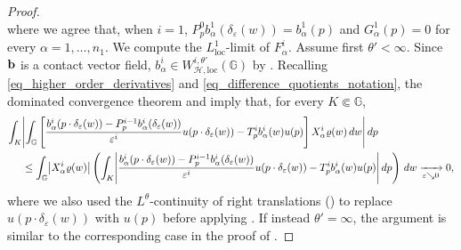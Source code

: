 \documentclass[11pt]{amsart}
\newcommand{\hhh}{{\mathcal{H}}}
\newcommand{\bb}{{\bf {b}}} %
\renewcommand{\rho}{\varrho} %
\newcommand{\Om}{\Omega}
\newcommand{\eps}{\varepsilon}
\DeclarePairedDelimiter{\abs}{\lvert}{\rvert}
\theoremstyle{plain}
\theoremstyle{definition}
\theoremstyle{remark}
\numberwithin{equation}{section}
\begin{document}
\begin{proof}
\begin{equation*}
\end{equation*}
where we agree that, when $i=1$, $P^0_p b^1_\alpha(\delta_\eps(w)) = b^1_\alpha(p)$ and $G^1_\alpha(p)=0$ for every $\alpha=1,\dots,n_1$. We compute the $L^1_{\mathrm {loc}}$-limit of $F^i_\alpha$. Assume first $\theta'<\infty$. Since $\bb$ is a contact vector field, $b^i_\alpha \in W^{i,\theta'}_{\hhh,\mathrm{loc}}(\mathbb{G})$ by . Recalling \eqref{eq_higher_order_derivatives} and \eqref{eq_difference_quotients_notation}, the dominated convergence theorem and  imply that, for every $K \Subset \mathbb{G}$,
\begin{equation*}
\begin{split}
    \int_K & \abs*{\int_{\mathbb{G}} \left[\frac{b^i_\alpha(p \cdot \delta_\eps(w))-P^{i-1}_p b^i_\alpha (\delta_\eps(w))}{\eps^i} u(p \cdot \delta_\eps(w)) - T^i_p b^i_\alpha(w) u(p) \right] X^i_\alpha \rho(w)\,dw}\,dp\\
    & \leq \int_{\mathbb{G}} \abs*{X^i_\alpha \rho(w)} \left(\int_K \abs*{\frac{b^i_\alpha(p \cdot \delta_\eps(w))-P^{i-1}_p b^i_\alpha (\delta_\eps(w))}{\eps^i} u(p \cdot \delta_\eps(w))- T^i_p b^i_\alpha(w) u(p)} \,dp \right)\,dw \xrightarrow[\varepsilon \searrow 0]{} 0,
\end{split}
\end{equation*}
where we also used the $L^\theta$-continuity of right translations () to replace $u(p \cdot \delta_\varepsilon(w))$ with $u(p)$ before applying . If instead $\theta'=\infty$, the argument is similar to the corresponding case in the proof of \cite[Lemma 4.10]{dpl1}.

\end{proof}
\end{document}
